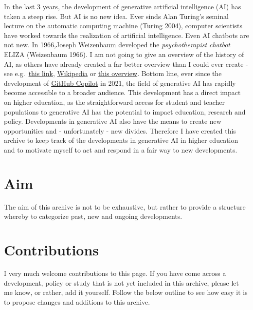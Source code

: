 \documentclass[
  letterpaper,
  DIV=11,
  numbers=noendperiod]{scrreprt}
\begin{document}
In the last 3 years, the development of generative artificial
intelligence (AI) has taken a steep rise. But AI is no new idea. Ever
sinds Alan Turing's seminal lecture on the automatic computing machine
(Turing 2004), computer scientists have worked towards the realization
of artificial intelligence. Even AI chatbots are not new. In 1966,Joseph
Weizenbaum developed the \emph{psychotherapist chatbot} ELIZA
(Weizenbaum 1966). I am not going to give an overview of the history of
AI, as others have already created a far better overview than I could
ever create - see
e.g.~\href{https://toloka.ai/blog/history-of-generative-ai/}{this link},
\href{https://en.wikipedia.org/wiki/Generative_artificial_intelligence}{Wikipedia}
or
\href{https://bernardmarr.com/a-simple-guide-to-the-history-of-generative-ai/}{this
overview}. Bottom line, ever since the development of
\href{https://github.com/features/copilot}{GitHub Copilot} in 2021, the
field of generative AI has rapidly become accessible to a broader
audience. This development has a direct impact on higher education, as
the straightforward access for student and teacher populations to
generative AI has the potential to impact education, research and
policy. Developments in generative AI also have the means to create new
opportunities and - unfortunately - new divides. Therefore I have
created this archive to keep track of the developments in generative AI
in higher education and to motivate myself to act and respond in a fair
way to new developments.

\section{Aim}\label{aim}

The aim of this archive is not to be exhaustive, but rather to provide a
structure whereby to categorize past, new and ongoing developments.

\section{Contributions}\label{contributions}

I very much welcome contributions to this page. If you have come across
a development, policy or study that is not yet included in this archive,
please let me know, or rather, add it yourself. Follow the below outline
to see how easy it is to propose changes and additions to this archive.
\end{document}
